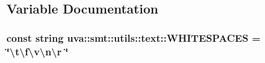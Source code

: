 \subsection{Variable Documentation}
\hypertarget{namespaceuva_1_1smt_1_1utils_1_1text_a1251cf45616a5bc009c8dfb643b794e1}{}
\subsubsection[{W\+H\+I\+T\+E\+S\+P\+A\+C\+E\+S}]{\setlength{\rightskip}{0pt plus 5cm}const string uva\+::smt\+::utils\+::text\+::\+W\+H\+I\+T\+E\+S\+P\+A\+C\+E\+S = \char`\"{}\textbackslash{}t\textbackslash{}f\textbackslash{}v\textbackslash{}n\textbackslash{}r \char`\"{}}\label{namespaceuva_1_1smt_1_1utils_1_1text_a1251cf45616a5bc009c8dfb643b794e1}
